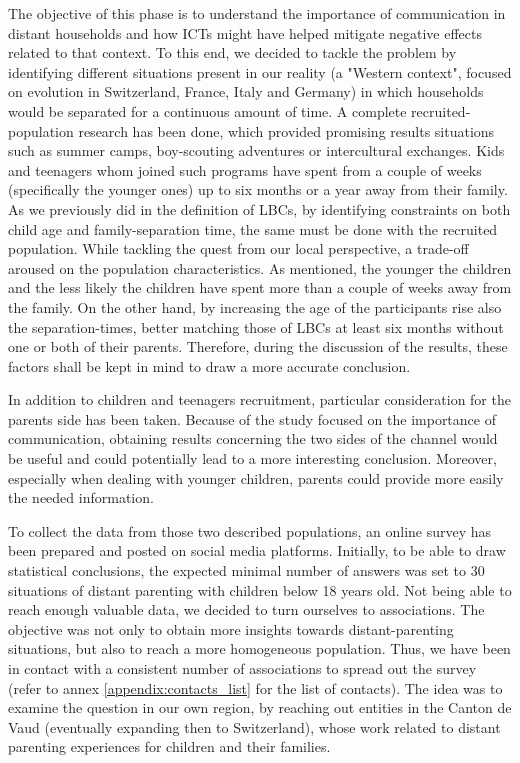 The objective of this phase is to understand the importance of communication in distant households and how ICTs might have helped mitigate negative effects related to that context. To this end, we decided to tackle the problem by identifying different situations present in our reality (a "Western context", focused on evolution in Switzerland, France, Italy and Germany) in which households would be separated for a continuous amount of time. A complete recruited-population research has been done, which provided promising results situations such as summer camps, boy-scouting adventures or intercultural exchanges. Kids and teenagers whom joined such programs have spent from a couple of weeks (specifically the younger ones) up to six months or a year away from their family. As we previously did in the definition of LBCs, by identifying constraints on both child age and family-separation time, the same must be done with the recruited population. While tackling the quest from our local perspective, a trade-off aroused on the population characteristics. As mentioned, the younger the children and the less likely the children have spent more than a couple of weeks away from the family. On the other hand, by increasing the age of the participants rise also the separation-times, better matching those of LBCs at least six months without one or both of their parents. Therefore, during the discussion of the results, these factors shall be kept in mind to draw a more accurate conclusion.

In addition to children and teenagers recruitment, particular consideration for the parents side has been taken. Because of the study focused on the importance of communication, obtaining results concerning the two sides of the channel would be useful and could potentially lead to a more interesting conclusion. Moreover, especially when dealing with younger children, parents could provide more easily the needed information. 

To collect the data from those two described populations, an online survey has been prepared and posted on social media platforms. Initially, to be able to draw statistical conclusions, the expected minimal number of answers was set to 30 situations of distant parenting with children below 18 years old. Not being able to reach enough valuable data, we decided to turn ourselves to associations. The objective was not only to obtain more insights towards distant-parenting situations, but also to reach a more homogeneous population. Thus, we have been in contact with a consistent number of associations to spread out the survey (refer to annex \ref{appendix:contacts_list} for the list of contacts). The idea was to examine the question in our own region, by reaching out entities in the Canton de Vaud (eventually expanding then to Switzerland), whose work related to distant parenting experiences for children and their families. 


